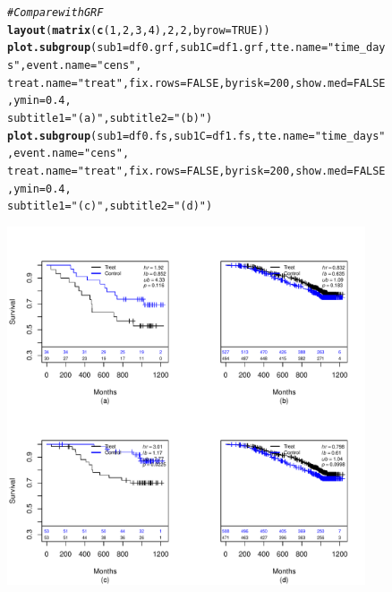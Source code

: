 \documentclass[9pt]{article}\usepackage[]{graphicx}\usepackage[]{xcolor}
\makeatletter
\newcommand{\hlnum}[1]{\textcolor[rgb]{0.686,0.059,0.569}{#1}}%
\newcommand{\hlstr}[1]{\textcolor[rgb]{0.192,0.494,0.8}{#1}}%
\newcommand{\hlcom}[1]{\textcolor[rgb]{0.678,0.584,0.686}{\textit{#1}}}%
\newcommand{\hlstd}[1]{\textcolor[rgb]{0.345,0.345,0.345}{#1}}%
\newcommand{\hlkwc}[1]{\textcolor[rgb]{0.333,0.667,0.333}{#1}}%
\newcommand{\hlkwd}[1]{\textcolor[rgb]{0.737,0.353,0.396}{\textbf{#1}}}%
\newenvironment{kframe}{%
 \def\at@end@of@kframe{}%
 \ifinner\ifhmode%
  \def\at@end@of@kframe{\end{minipage}}%
  \begin{minipage}{\columnwidth}%
 \fi\fi%
 \def\FrameCommand##1{\hskip\@totalleftmargin \hskip-\fboxsep
 \colorbox{shadecolor}{##1}\hskip-\fboxsep
     \hskip-\linewidth \hskip-\@totalleftmargin \hskip\columnwidth}%
 \MakeFramed {\advance\hsize-\width
   \@totalleftmargin\z@ \linewidth\hsize
   \@setminipage}}%
 {\par\unskip\endMakeFramed%
 \at@end@of@kframe}
\newenvironment{knitrout}{}{} %
\theoremstyle{definition}
\theoremstyle{remark}
\makeatother
\begin{document}
\begin{figure}[h!]
\begin{center}
\begin{knitrout}
\color{fgcolor}\begin{kframe}
\begin{alltt}
\hlcom{# Compare with GRF}
\hlkwd{layout}\hlstd{(}\hlkwd{matrix}\hlstd{(}\hlkwd{c}\hlstd{(}\hlnum{1}\hlstd{,} \hlnum{2}\hlstd{,} \hlnum{3}\hlstd{,} \hlnum{4}\hlstd{),} \hlnum{2}\hlstd{,} \hlnum{2}\hlstd{,} \hlkwc{byrow} \hlstd{=} \hlnum{TRUE}\hlstd{))}
\hlkwd{plot.subgroup}\hlstd{(}\hlkwc{sub1} \hlstd{= df0.grf,} \hlkwc{sub1C} \hlstd{= df1.grf,} \hlkwc{tte.name} \hlstd{=} \hlstr{"time_days"}\hlstd{,} \hlkwc{event.name} \hlstd{=} \hlstr{"cens"}\hlstd{,}
    \hlkwc{treat.name} \hlstd{=} \hlstr{"treat"}\hlstd{,} \hlkwc{fix.rows} \hlstd{=} \hlnum{FALSE}\hlstd{,} \hlkwc{byrisk} \hlstd{=} \hlnum{200}\hlstd{,} \hlkwc{show.med} \hlstd{=} \hlnum{FALSE}\hlstd{,} \hlkwc{ymin} \hlstd{=} \hlnum{0.4}\hlstd{,}
    \hlkwc{subtitle1} \hlstd{=} \hlstr{"(a)"}\hlstd{,} \hlkwc{subtitle2} \hlstd{=} \hlstr{"(b)"}\hlstd{)}
\hlkwd{plot.subgroup}\hlstd{(}\hlkwc{sub1} \hlstd{= df0.fs,} \hlkwc{sub1C} \hlstd{= df1.fs,} \hlkwc{tte.name} \hlstd{=} \hlstr{"time_days"}\hlstd{,} \hlkwc{event.name} \hlstd{=} \hlstr{"cens"}\hlstd{,}
    \hlkwc{treat.name} \hlstd{=} \hlstr{"treat"}\hlstd{,} \hlkwc{fix.rows} \hlstd{=} \hlnum{FALSE}\hlstd{,} \hlkwc{byrisk} \hlstd{=} \hlnum{200}\hlstd{,} \hlkwc{show.med} \hlstd{=} \hlnum{FALSE}\hlstd{,} \hlkwc{ymin} \hlstd{=} \hlnum{0.4}\hlstd{,}
    \hlkwc{subtitle1} \hlstd{=} \hlstr{"(c)"}\hlstd{,} \hlkwc{subtitle2} \hlstd{=} \hlstr{"(d)"}\hlstd{)}
\end{alltt}
\end{kframe}
\includegraphics[width=400px,height=400px]{figure/grf-fs_sg-1} 
\end{knitrout}
\end{center}
\end{figure}
\end{document}
